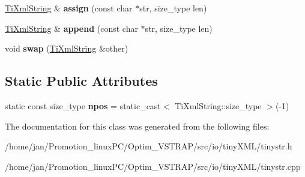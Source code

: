 \begin{DoxyCompactItemize}
\hyperlink{classTiXmlString}{Ti\+Xml\+String} \& {\bfseries assign} (const char $\ast$str, size\+\_\+type len)
\item 
\mbox{\label{classTiXmlString_ad44b21700d2ec24a511367b222b643fb}} 
\hyperlink{classTiXmlString}{Ti\+Xml\+String} \& {\bfseries append} (const char $\ast$str, size\+\_\+type len)
\item 
\mbox{\label{classTiXmlString_aa392cbc180752a79f007f4f9280c7762}} 
void {\bfseries swap} (\hyperlink{classTiXmlString}{Ti\+Xml\+String} \&other)
\end{DoxyCompactItemize}
\subsection*{Static Public Attributes}
\begin{DoxyCompactItemize}
\item 
\mbox{\label{classTiXmlString_a8f4422d227088dc7bec96f479b275d0a}} 
static const size\+\_\+type {\bfseries npos} = static\+\_\+cast$<$ Ti\+Xml\+String\+::size\+\_\+type $>$(-\/1)
\end{DoxyCompactItemize}


The documentation for this class was generated from the following files\+:\begin{DoxyCompactItemize}
\item 
/home/jan/\+Promotion\+\_\+linux\+P\+C/\+Optim\+\_\+\+V\+S\+T\+R\+A\+P/src/io/tiny\+X\+M\+L/tinystr.\+h\item 
/home/jan/\+Promotion\+\_\+linux\+P\+C/\+Optim\+\_\+\+V\+S\+T\+R\+A\+P/src/io/tiny\+X\+M\+L/tinystr.\+cpp\end{DoxyCompactItemize}
